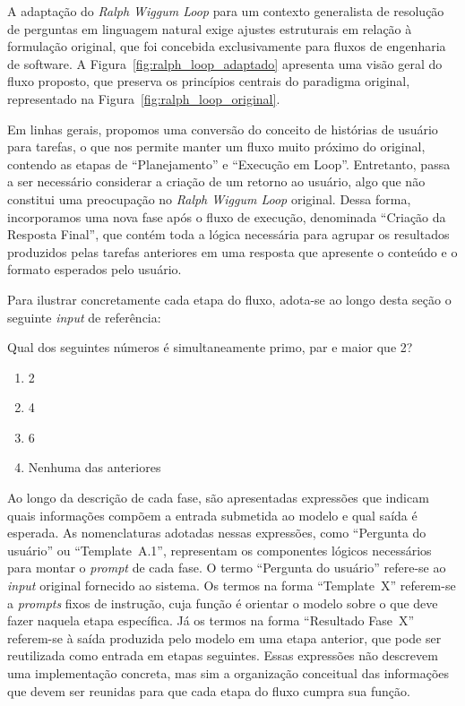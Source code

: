 \documentclass[a4paper,10pt,twocolumn]{article}
\begin{document}
A adaptação do \textit{Ralph Wiggum Loop} para um contexto generalista de resolução de perguntas em linguagem natural exige ajustes estruturais em relação à formulação original, que foi concebida exclusivamente para fluxos de engenharia de software. A Figura~\ref{fig:ralph_loop_adaptado} apresenta uma visão geral do fluxo proposto, que preserva os princípios centrais do paradigma original, representado na Figura~\ref{fig:ralph_loop_original}.

Em linhas gerais, propomos uma conversão do conceito de histórias de usuário para tarefas, o que nos permite manter um fluxo muito próximo do original, contendo as etapas de ``Planejamento'' e ``Execução em Loop''. Entretanto, passa a ser necessário considerar a criação de um retorno ao usuário, algo que não constitui uma preocupação no \textit{Ralph Wiggum Loop} original. Dessa forma, incorporamos uma nova fase após o fluxo de execução, denominada ``Criação da Resposta Final'', que contém toda a lógica necessária para agrupar os resultados produzidos pelas tarefas anteriores em uma resposta que apresente o conteúdo e o formato esperados pelo usuário.

Para ilustrar concretamente cada etapa do fluxo, adota-se ao longo desta seção o seguinte \textit{input} de referência:

\begin{exemplo}
Qual dos seguintes números é simultaneamente primo, par e maior que 2?

\begin{enumerate}[label=\Alph*)]
    \item 2
    \item 4
    \item 6
    \item Nenhuma das anteriores
\end{enumerate}
\end{exemplo}

Ao longo da descrição de cada fase, são apresentadas expressões que indicam quais informações compõem a entrada submetida ao modelo e qual saída é esperada. As nomenclaturas adotadas nessas expressões, como ``Pergunta do usuário'' ou ``Template~A.1'', representam os componentes lógicos necessários para montar o \textit{prompt} de cada fase. O termo ``Pergunta do usuário'' refere-se ao \textit{input} original fornecido ao sistema. Os termos na forma ``Template~X'' referem-se a \textit{prompts} fixos de instrução, cuja função é orientar o modelo sobre o que deve fazer naquela etapa específica. Já os termos na forma ``Resultado Fase~X'' referem-se à saída produzida pelo modelo em uma etapa anterior, que pode ser reutilizada como entrada em etapas seguintes. Essas expressões não descrevem uma implementação concreta, mas sim a organização conceitual das informações que devem ser reunidas para que cada etapa do fluxo cumpra sua função.
\end{document}
